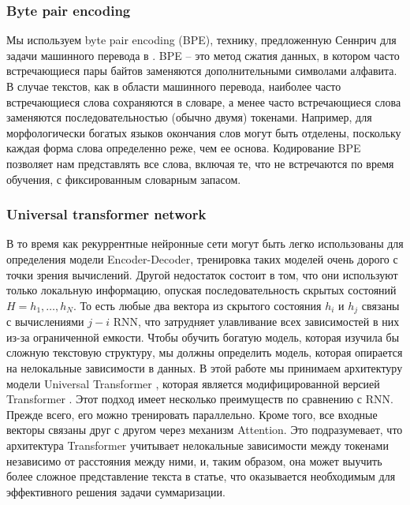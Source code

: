 \documentclass[14pt]{matmex-diploma-custom}
\begin{document}



\subsubsection{Byte pair encoding}

Мы используем byte pair encoding (BPE), технику, предложенную Сеннрич для задачи машинного перевода в \cite{DBLP:journals/corr/SennrichHB15}. BPE -- это метод сжатия данных, в котором часто встречающиеся пары байтов заменяются дополнительными символами алфавита. В случае текстов, как в области машинного перевода, наиболее часто встречающиеся слова сохраняются в словаре, а менее часто встречающиеся слова заменяются последовательностью (обычно двумя) токенами. Например, для морфологически богатых языков окончания слов могут быть отделены, поскольку каждая форма слова определенно реже, чем ее основа. Кодирование BPE позволяет нам представлять все слова, включая те, что не встречаются по время обучения, с фиксированным словарным запасом.



\subsubsection{Universal transformer network}
В то время как рекуррентные нейронные сети могут быть легко использованы для определения модели Encoder-Decoder, тренировка таких моделей очень дорого с точки зрения вычислений. Другой недостаток состоит в том, что они используют только локальную информацию, опуская последовательность скрытых состояний $H = {h_1, \dots, h_N}$. То есть любые два вектора из скрытого состояния $h_i$ и $h_j$ связаны с вычислениями $j - i$ RNN, что затрудняет улавливание всех зависимостей в них из-за ограниченной емкости. Чтобы обучить богатую модель, которая изучила бы сложную текстовую структуру, мы должны определить модель, которая опирается на нелокальные зависимости в данных.
В этой работе мы принимаем архитектуру модели Universal Transformer \cite{DBLP:journals/corr/abs-1807-03819}, которая является модифицированной версией Transformer \cite{DBLP:journals/corr/VaswaniSPUJGKP17}. Этот подход имеет несколько преимуществ по сравнению с RNN. Прежде всего, его можно тренировать параллельно. Кроме того, все входные векторы связаны друг с другом через механизм Attention. Это подразумевает, что архитектура Transformer учитывает нелокальные зависимости между токенами независимо от расстояния между ними, и, таким образом, она может выучить более сложное представление текста в статье, что оказывается необходимым для эффективного решения задачи суммаризации.
\end{document}
